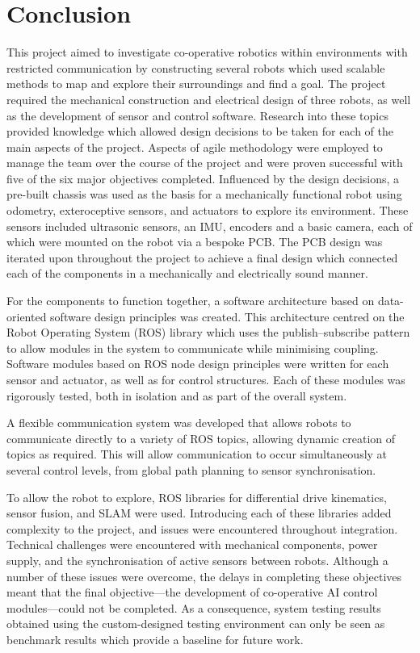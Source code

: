 
\chapter{Conclusion}\label{conclusion}
This project aimed to investigate co-operative robotics within environments
with restricted communication by constructing several robots
which used scalable methods to map and explore their surroundings and find
a goal. The project required the mechanical construction and
electrical design of three robots, as well as the development of sensor and
control software.  Research into these topics provided knowledge which allowed
design decisions to be taken for each of the main aspects of the project.
Aspects of agile methodology were employed to manage the team over the course of
the project and were proven successful with five of the six major objectives
completed. Influenced by the design decisions, a pre-built chassis was
used as the basis for a mechanically functional robot using odometry,
exteroceptive sensors, and actuators to explore its environment. These sensors
included ultrasonic sensors, an IMU, encoders and a basic
camera, each of which were mounted on the robot via a bespoke PCB. The PCB
design was iterated upon throughout the project to achieve a final design
which connected each of the components in a mechanically and
electrically sound manner.

For the components to function together, a software
architecture based on data-oriented software design principles was
created. This architecture centred on the Robot Operating System (ROS)
library which uses the publish--subscribe pattern to allow modules in the
system to communicate while minimising coupling. Software modules based on
ROS node design principles were written for each sensor and actuator, as well
as for control structures. Each of these modules was rigorously tested, both
in isolation and as part of the overall system.

A flexible communication system was developed that allows robots to communicate
directly to a variety of ROS topics, allowing dynamic creation of topics as required.
This will allow communication to occur simultaneously at several control levels,
from global path planning to sensor synchronisation.

To allow the robot to explore, ROS libraries for differential drive kinematics,
sensor fusion, and SLAM were used.
Introducing each of these libraries added complexity to the project, and
issues were encountered throughout integration. Technical challenges were
encountered with mechanical components, power supply, and the synchronisation of
active sensors between robots. Although a number of these
issues were overcome, the delays in completing these objectives meant that
the final objective---the development of co-operative AI control modules---could
not be completed. As a consequence, system testing results obtained using the
custom-designed testing environment can only be seen as benchmark results which
provide a baseline for future work.


